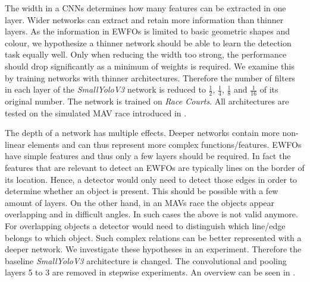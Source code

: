 The width in a \acp{CNN} determines how many features can be extracted in one layer. Wider networks can extract and retain more information than thinner layers. As the information in \acp{EWFO} is limited to basic geometric shapes and colour, we hypothesize a thinner network should be able to learn the detection task equally well. Only when reducing the width too strong, the performance should drop significantly as a minimum of weights is required. We examine this by training networks with thinner architectures. Therefore the number of filters in each layer of the \textit{SmallYoloV3} network is reduced to $\frac{1}{2}$, $\frac{1}{4}$, $\frac{1}{8}$ and $\frac{1}{16}$ of its original number. The network is trained on \textit{Race Courts}. All architectures are tested on the simulated \ac{MAV} race introduced in .

The depth of a network has multiple effects. Deeper networks contain more non-linear elements and can thus represent more complex functions/features. \acp{EWFO} have simple features and thus only a few layers should be required. In fact the features that are relevant to detect an \acp{EWFO} are typically lines on the border of its location. Hence, a detector would only need to detect those edges in order to determine whether an object is present. This should be possible with a few amount of layers. On the other hand, in an \acp{MAV} race the objects appear overlapping and in difficult angles. In such cases the above is not valid anymore. For overlapping objects a detector would need to distinguish which line/edge belongs to which object. Such complex relations can be better represented with a deeper network. We investigate these hypotheses in an experiment. Therefore the baseline \textit{SmallYoloV3} architecture is changed. The convolutional and pooling layers 5 to 3 are removed in stepwise experiments. An overview can be seen in .

